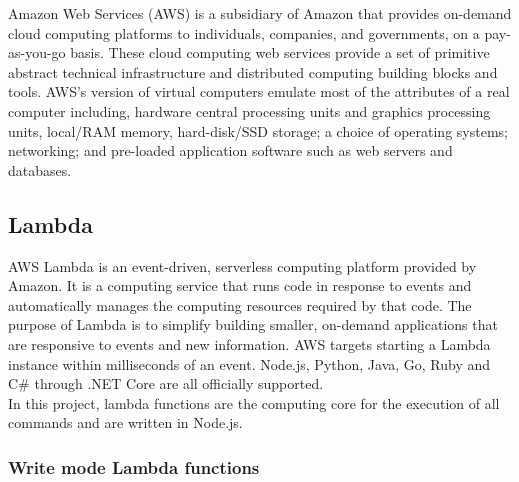 Amazon Web Services (AWS) is a subsidiary of Amazon that provides on-demand cloud computing platforms to individuals, companies, and governments, on a pay-as-you-go basis. These cloud computing web services provide a set of primitive abstract technical infrastructure and distributed computing building blocks and tools. AWS's version of virtual computers emulate most of the attributes of a real computer including, hardware central processing units and graphics processing units, local/RAM memory, hard-disk/SSD storage; a choice of operating systems; networking; and pre-loaded application software such as web servers and databases.

\subsection{Lambda}
AWS Lambda is an event-driven, serverless computing platform provided by Amazon. It is a computing service that runs code in response to events and automatically manages the computing resources required by that code. The purpose of Lambda is to simplify building smaller, on-demand applications that are responsive to events and new information. AWS targets starting a Lambda instance within milliseconds of an event. Node.js, Python, Java, Go, Ruby and C\# through .NET Core are all officially supported.\\

In this project, lambda functions are the computing core for the execution of all commands and are written in Node.js.

\subsubsection{Write mode Lambda functions}
